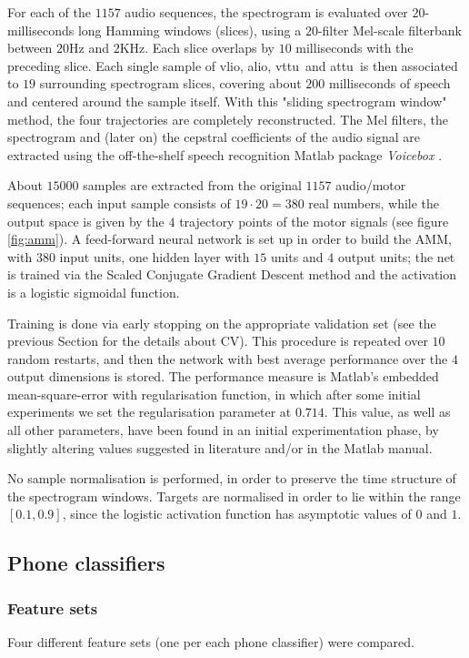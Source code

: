 \documentclass[10pt]{article}
\newcommand{\vlio}{\textsf{vlio}}
\newcommand{\vttu}{\textsf{vttu}}
\newcommand{\alio}{\textsf{alio}}
\newcommand{\attu}{\textsf{attu}}
\begin{document}
For each of the $1157$ audio sequences, the spectrogram is evaluated
over $20$-milliseconds long Hamming windows (slices), using a $20$-filter
Mel-scale filterbank between $20$Hz and $2$KHz. Each slice overlaps by $10$ milliseconds with
the preceding slice. Each single sample of \vlio, \alio, \vttu\ and \attu\ is
then associated to $19$ surrounding spectrogram slices, covering
about $200$ milliseconds of speech and centered around the sample itself. With this
"sliding spectrogram window" method, the four trajectories are completely reconstructed.
The Mel filters, the spectrogram and (later on) the cepstral coefficients of the audio
signal are extracted using the off-the-shelf speech recognition Matlab package
\emph{Voicebox} \cite{Brookes1997}.

About $15000$ samples are extracted from the original $1157$
audio/motor sequences; each input sample consists of $19\cdot 20 = 380$ real
numbers, while the output space is given by the $4$ trajectory points of
the motor signals (see figure \ref{fig:amm}).
A feed-forward neural network is set up in order to
build the AMM, with $380$ input units, one hidden layer with $15$ units and
$4$ output units; the net is trained via the Scaled Conjugate Gradient
Descent method \cite{MOLLER93} and the activation is a logistic sigmoidal function.

Training is done via early stopping on the appropriate validation set (see the previous
Section for the details about CV). This procedure is repeated over $10$ random restarts, and then
the network with best average performance over the $4$ output dimensions is stored.
The performance measure is Matlab's embedded mean-square-error with regularisation
function, in which after some initial experiments we set the regularisation
parameter at $0.714$. This value, as well as all other parameters, have been found in
an initial experimentation phase, by slightly altering values suggested in literature
and/or in the Matlab manual.

No sample normalisation is performed, in order to preserve the time structure of the
spectrogram windows. Targets are normalised in order to lie within the range $[0.1,0.9]$,
since the logistic activation function has asymptotic values of $0$ and $1$.


\subsection*{Phone classifiers}
\label{subsec:featset}

\subsubsection*{Feature sets}
Four different feature sets (one per each phone classifier) were compared. 
\end{document}
